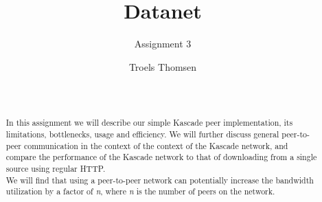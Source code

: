 \documentclass{acm_proc_article-sp}
\begin{document}
\title{Datanet}
\subtitle{Assignment 3}

%
%
%
%


\author{
%
%
\alignauthor
Troels Thomsen\\
       \\
       \\
}

\maketitle

\begin{abstract}
In this assignment we will describe our simple Kascade peer implementation, its limitations, bottlenecks, usage and efficiency. We will further discuss general peer-to-peer communication in the context of the context of the Kascade network, and compare the performance of the Kascade network to that of downloading from a single source using regular HTTP.\\
We will find that using a peer-to-peer network can potentially increase the bandwidth utilization by a factor of \textit{n}, where \textit{n} is the number of peers on the network.
\end{abstract}
\end{document}

